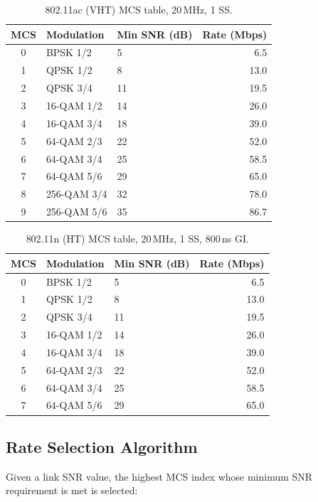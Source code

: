 \documentclass[11pt,letterpaper]{article}
\begin{document}
\begin{table}[h]
\centering
\caption{802.11ac (VHT) MCS table, 20\,MHz, 1 SS.}
\label{tab:mcs_ac}
\begin{tabular}{@{}cllr@{}}
\toprule
\textbf{MCS} & \textbf{Modulation} & \textbf{Min SNR (dB)} & \textbf{Rate (Mbps)} \\
\midrule
0  & BPSK 1/2     & 5  & 6.5 \\
1  & QPSK 1/2     & 8  & 13.0 \\
2  & QPSK 3/4     & 11 & 19.5 \\
3  & 16-QAM 1/2   & 14 & 26.0 \\
4  & 16-QAM 3/4   & 18 & 39.0 \\
5  & 64-QAM 2/3   & 22 & 52.0 \\
6  & 64-QAM 3/4   & 25 & 58.5 \\
7  & 64-QAM 5/6   & 29 & 65.0 \\
8  & 256-QAM 3/4  & 32 & 78.0 \\
9  & 256-QAM 5/6  & 35 & 86.7 \\
\bottomrule
\end{tabular}
\end{table}

\begin{table}[h]
\centering
\caption{802.11n (HT) MCS table, 20\,MHz, 1 SS, 800\,ns GI.}
\label{tab:mcs_n}
\begin{tabular}{@{}cllr@{}}
\toprule
\textbf{MCS} & \textbf{Modulation} & \textbf{Min SNR (dB)} & \textbf{Rate (Mbps)} \\
\midrule
0 & BPSK 1/2    & 5  & 6.5 \\
1 & QPSK 1/2    & 8  & 13.0 \\
2 & QPSK 3/4    & 11 & 19.5 \\
3 & 16-QAM 1/2  & 14 & 26.0 \\
4 & 16-QAM 3/4  & 18 & 39.0 \\
5 & 64-QAM 2/3  & 22 & 52.0 \\
6 & 64-QAM 3/4  & 25 & 58.5 \\
7 & 64-QAM 5/6  & 29 & 65.0 \\
\bottomrule
\end{tabular}
\end{table}

\subsection{Rate Selection Algorithm}

Given a link SNR value, the highest MCS index whose minimum SNR requirement is
met is selected:
\end{document}
